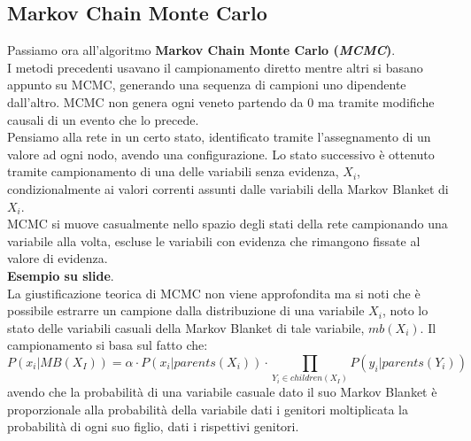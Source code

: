 \message{ !name(modprob.tex)}\documentclass[a4paper,12pt, oneside]{book}
\begin{document}
\subsection{Markov Chain Monte Carlo}
Passiamo ora all'algoritmo \textbf{Markov Chain Monte Carlo (\textit{MCMC})}.\\
I metodi precedenti usavano il campionamento diretto mentre altri si basano
appunto su MCMC, generando una sequenza di campioni uno dipendente
dall'altro. MCMC non genera ogni veneto partendo da 0 ma tramite modifiche
causali di un evento che lo precede. \\
Pensiamo alla rete in un certo stato, identificato tramite l'assegnamento di un
valore ad ogni nodo, avendo una configurazione. Lo stato successivo è ottenuto
tramite campionamento di una delle variabili senza evidenza, $X_i$,
condizionalmente ai valori correnti assunti dalle variabili della Markov Blanket
di $X_i$.\\
MCMC si muove casualmente nello spazio degli stati della rete
campionando una variabile alla volta, escluse le variabili con evidenza che
rimangono fissate al valore di evidenza.\\
\textbf{Esempio su slide}.\\
La giustificazione teorica di MCMC non viene approfondita ma si noti che è
possibile estrarre un campione dalla distribuzione di una variabile $X_i$, noto
lo stato delle variabili casuali della Markov Blanket di tale variabile,
$mb(X_i)$. Il campionamento si basa sul fatto che:
\[P(x_i|MB(X_I))=\alpha\cdot P(x_i|parents(X_i))\cdot \prod_{Y_i\in
    children(X_I)}P(y_i|parents (Y_i))\]
avendo che la probabilità di una variabile casuale dato il suo Markov Blanket è
proporzionale alla probabilità della variabile dati i genitori moltiplicata la
probabilità di ogni suo figlio, dati i rispettivi genitori.
\end{document}
